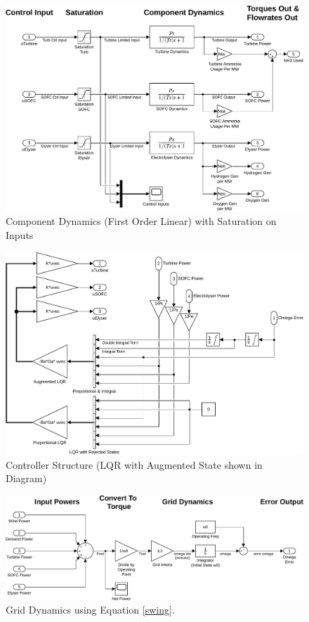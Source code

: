 \begin{figure}[p]
\centering
        \includegraphics[scale=0.7]{images/plant2/comp.pdf}
    \caption{Component Dynamics (First Order Linear) with Saturation on Inputs}
        \label{fig:comp}
\end{figure}
\begin{figure}[p]
\centering
        \includegraphics[scale=0.7]{images/plant2/ctrl.pdf}
    \caption{Controller Structure (LQR with Augmented State shown in Diagram)}
        \label{fig:ctrl}
\end{figure}
\begin{figure}[p]
\centering
        \includegraphics[scale=0.65]{images/plant2/grid.pdf}
    \caption{Grid Dynamics using Equation \ref{swing}.}
        \label{fig:grid}
\end{figure}
